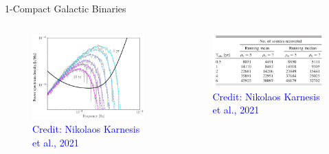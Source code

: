 \documentclass[pdf]{beamer}
\newcommand{\credit}[1]{\tiny{\textcolor{blue}{Credit: #1}}}
\begin{document}
\begin{frame}{1-Compact Galactic Binaries}
\begin{columns}
\begin{figure}
\includegraphics[width = \textwidth]{fig/FittingPSD.png}
\caption*{\credit{Nikolaos Karnesis et al., 2021}}
\end{figure}
\begin{figure}
\includegraphics[width = \textwidth]{fig/Table1.png}
\caption*{\credit{Nikolaos Karnesis et al., 2021}}
\end{figure}

\end{columns}
\end{frame}
\end{document}
